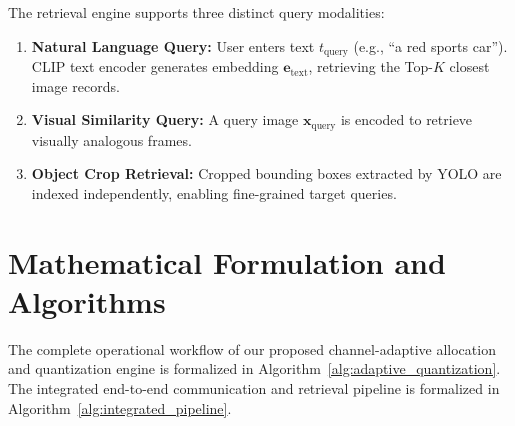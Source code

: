 \documentclass[journal,twocolumn]{IEEEtran}
\begin{document}
The retrieval engine supports three distinct query modalities:
\begin{enumerate}
    \item \textbf{Natural Language Query:} User enters text $t_{\text{query}}$ (e.g., ``a red sports car''). CLIP text encoder generates embedding $\mathbf{e}_{\text{text}}$, retrieving the Top-$K$ closest image records.
    \item \textbf{Visual Similarity Query:} A query image $\mathbf{x}_{\text{query}}$ is encoded to retrieve visually analogous frames.
    \item \textbf{Object Crop Retrieval:} Cropped bounding boxes extracted by YOLO are indexed independently, enabling fine-grained target queries.
\end{enumerate}

\section{Mathematical Formulation and Algorithms}
The complete operational workflow of our proposed channel-adaptive allocation and quantization engine is formalized in Algorithm~\ref{alg:adaptive_quantization}. The integrated end-to-end communication and retrieval pipeline is formalized in Algorithm~\ref{alg:integrated_pipeline}.
\end{document}
